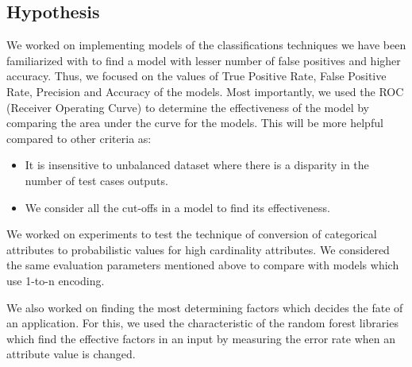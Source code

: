 \documentclass{article} %
\begin{document}
\subsection{Hypothesis}
We worked on implementing models of the classifications techniques we have been familiarized with to find a model with lesser number of false positives and higher accuracy. Thus, we focused on the values of True Positive Rate, False Positive Rate, Precision and Accuracy of the models. Most importantly, we used the ROC (Receiver Operating Curve) to determine the effectiveness of the model by comparing the area under the curve for the models. This will be more helpful compared to other criteria as:
\begin{itemize}
	\item It is insensitive to unbalanced dataset where there is a disparity in the number of test cases outputs.  
	\item We consider all the cut-offs in a model to find its effectiveness.
\end{itemize}

We worked on experiments to test the technique of conversion of categorical attributes to probabilistic values for high cardinality attributes\cite{HighCard}. We considered the same evaluation parameters mentioned above to compare with models which use 1-to-n encoding. 

We also worked on finding the most determining factors which decides the fate of an application. For this, we used the characteristic of the random forest libraries which find the effective factors in an input by measuring the error rate when an attribute value is changed. 
\end{document}
